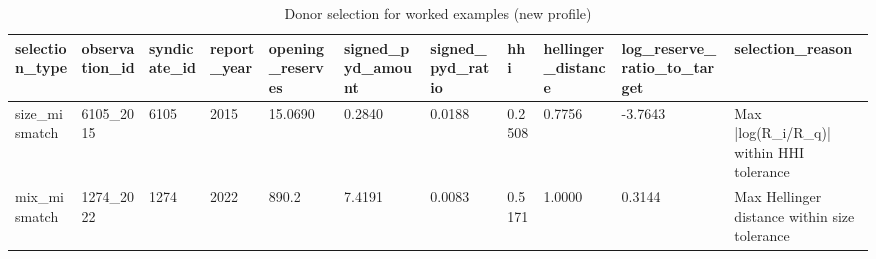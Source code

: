 \begin{table}[htbp]
\centering
\caption{Donor selection for worked examples (new profile)}
\label{tab:v2_donor_selection}
\begin{tabular}{lllllllllll}
\toprule
\textbf{selection_type} & \textbf{observation_id} & \textbf{syndicate_id} & \textbf{report_year} & \textbf{opening_reserves} & \textbf{signed_pyd_amount} & \textbf{signed_pyd_ratio} & \textbf{hhi} & \textbf{hellinger_distance} & \textbf{log_reserve_ratio_to_target} & \textbf{selection_reason} \\
\midrule
size_mismatch & 6105_2015 & 6105 & 2015 & 15.0690 & 0.2840 & 0.0188 & 0.2508 & 0.7756 & -3.7643 & Max |log(R_i/R_q)| within HHI tolerance \\
mix_mismatch & 1274_2022 & 1274 & 2022 & 890.2 & 7.4191 & 0.0083 & 0.5171 & 1.0000 & 0.3144 & Max Hellinger distance within size tolerance \\
\bottomrule
\end{tabular}
\end{table}
